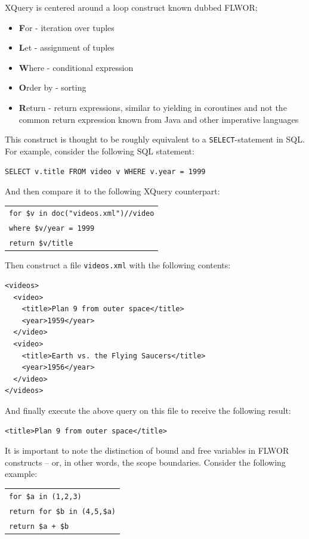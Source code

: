 XQuery is centered around a loop construct known dubbed FLWOR;
\begin{itemize}
  \item \textbf{F}or - iteration over tuples
  \item \textbf{L}et - assignment of tuples
  \item \textbf{W}here - conditional expression
  \item \textbf{O}rder by - sorting 
  \item \textbf{R}eturn - return expressions, similar to yielding in coroutines
  and not the common return expression known from Java and other imperative
  languages
\end{itemize}
This construct is thought to be roughly equivalent to a
\texttt{SELECT}-statement in SQL. For example, consider the following SQL
statement: 
\begin{center}
\verb!SELECT v.title FROM video v WHERE v.year = 1999!
\end{center}
And then compare it to the following XQuery counterpart:
\begin{center}
\begin{tabular}{l}
\texttt{for \$v in doc("videos.xml")//video} \\
\texttt{where \$v/year = 1999}\\
\texttt{return \$v/title}\\
\end{tabular}
\end{center}
Then construct a file \texttt{videos.xml} with the following contents:
\begin{center}
\begin{minipage}[h]{9.5cm}
\begin{verbatim}
<videos>
  <video>
    <title>Plan 9 from outer space</title>
    <year>1959</year>
  </video>
  <video>
    <title>Earth vs. the Flying Saucers</title>
    <year>1956</year>
  </video>
</videos>
\end{verbatim}
\end{minipage}
\end{center}
And finally execute the above query on this file to receive the following
result:
\begin{center}
\begin{minipage}[h]{7.5cm}
\begin{verbatim}
<title>Plan 9 from outer space</title>
\end{verbatim}
\end{minipage}
\end{center}
It is important to note the distinction of bound and free variables in FLWOR
constructs -- or, in other words, the scope boundaries. Consider the following
example:
\begin{center}
\begin{tabular}{l}
\texttt{for \$a in (1,2,3)} \\ \quad
  \texttt{return for \$b in (4,5,\$a)}\\ \quad\quad
    \texttt{return \$a + \$b}
\end{tabular}
\end{center}


